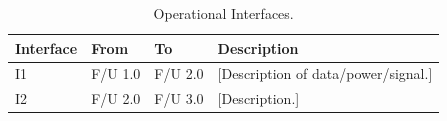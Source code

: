 \begin{table}[H]
    \centering
    \caption{Operational Interfaces.}
    \label{tab:interfaces}
    \begin{tabular}{@{} l l l p{5cm} @{}}
        \toprule
        \textbf{Interface} & \textbf{From} & \textbf{To} & \textbf{Description} \\
        \midrule
        I1 & F/U 1.0 & F/U 2.0 & [Description of data/power/signal.] \\
        I2 & F/U 2.0 & F/U 3.0 & [Description.] \\
        \bottomrule
    \end{tabular}
\end{table}
